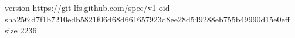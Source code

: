 version https://git-lfs.github.com/spec/v1
oid sha256:d7f1b7210edb5821f06d68d661657923d8ee28d549288eb755b49990d15e0eff
size 2236
